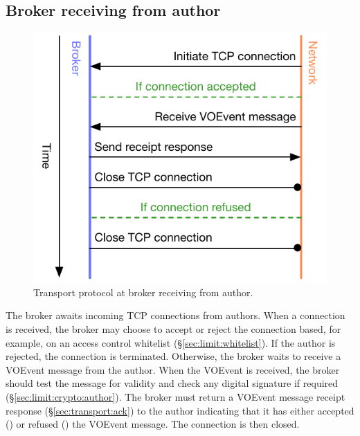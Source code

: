 \documentclass[a4paper,11pt]{ivoa}
\begin{document}
\subsection{Broker receiving from author}
\label{sec:protocol:brokerfromauthor}

\begin{figure}
  \begin{center}
  \includegraphics{figures/brokerfromauthor.pdf}
  \end{center}

  \caption{Transport protocol at broker receiving from author.}

  \label{fig:protocol:brokerfromauthor}
\end{figure}

The broker awaits incoming TCP connections from authors. When a connection is
received, the broker may choose to accept or reject the connection based, for
example, on an access control whitelist (\S\ref{sec:limit:whitelist}). If the
author is rejected, the connection is terminated. Otherwise, the broker
waits to receive a VOEvent message from the author. When the VOEvent is
received, the broker should test the message for validity and check any
digital signature if required (\S\ref{sec:limit:crypto:author}). The broker
must return a VOEvent message receipt response (\S\ref{sec:transport:ack}) to
the author indicating that it has either accepted () or refused
() the VOEvent message. The connection is then closed.
\end{document}
